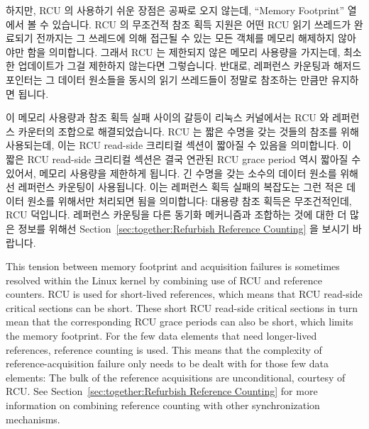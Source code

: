 하지만, RCU 의 사용하기 쉬운 장점은 공짜로 오지 않는데, ``Memory Footprint''
열에서 볼 수 있습니다.
RCU 의 무조건적 참조 획득 지원은 어떤 RCU 읽기 쓰레드가 완료되기 전까지는 그
쓰레드에 의해 접근될 수 있는 모든 객체를 메모리 해제하지 않아야만 함을
의미합니다.
그래서 RCU 는 제한되지 않은 메모리 사용량을 가지는데, 최소한 업데이트가 그걸
제한하지 않는다면 그렇습니다.
반대로, 레퍼런스 카운팅과 해저드 포인터는 그 데이터 원소들을 동시의 읽기
쓰레드들이 정말로 참조하는 만큼만 유지하면 됩니다.

\iffalse

Thus, when failing to acquire a reference, a hazard-pointer or
reference-counter traversal must restart that traversal from the
beginning.
In the case of nested linked data structures, for example, a
tree containing linked lists, the traversal must be restarted from
the outermost data structure.
This situation gives RCU a significant ease-of-use advantage.

However, RCU's ease-of-use advantage does not come
for free, as can be seen in the ``Memory Footprint'' row.
RCU's support of unconditional reference acquisition means that
it must avoid freeing any object reachable by a given
RCU reader until that reader completes.
RCU therefore has an unbounded memory footprint, at least unless updates
are throttled.
In contrast, reference counting and hazard pointers need to retain only
those data elements actually referenced by concurrent readers.

\fi

이 메모리 사용량과 참조 획득 실패 사이의 갈등이 리눅스 커널에서는 RCU 와
레퍼런스 카운터의 조합으로 해결되었습니다.
RCU 는 짧은 수명을 갖는 것들의 참조를 위해 사용되는데, 이는 RCU read-side
크리티컬 섹션이 짧아질 수 있음을 의미합니다.
이 짧은 RCU read-side 크리티컬 섹션은 결국 연관된 RCU grace period  역시 짧아질
수 있어서, 메모리 사용량을 제한하게 됩니다.
긴 수명을 갖는 소수의 데이터 원소를 위해선 레퍼런스 카운팅이 사용됩니다.
이는 레퍼런스 획득 실패의 복잡도는 그런 적은 데이터 원소를 위해서만 처리되면
됨을 의미합니다:  대용량 참조 획득은 무조건적인데, RCU 덕입니다.
레퍼런스 카운팅을 다른 동기화 메커니즘과 조합하는 것에 대한 더 많은 정보를
위해선
Section~\ref{sec:together:Refurbish Reference Counting} 을 보시기 바랍니다.

\iffalse

This tension between memory footprint and acquisition
failures is sometimes resolved within the Linux kernel by combining use
of RCU and reference counters.
RCU is used for short-lived references, which means that RCU read-side
critical sections can be short.
These short RCU read-side critical sections in turn mean that the corresponding
RCU grace periods can also be short, which limits the memory footprint.
For the few data elements that need longer-lived references, reference
counting is used.
This means that the complexity of reference-acquisition failure only
needs to be dealt with for those few data elements:  The bulk of
the reference acquisitions are unconditional, courtesy of RCU\@.
See Section~\ref{sec:together:Refurbish Reference Counting}
for more information on combining reference counting with other
synchronization mechanisms.


